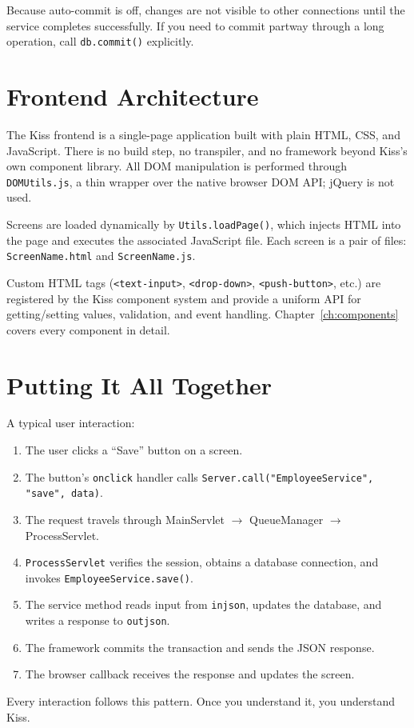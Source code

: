 \begin{warnbox}
Because auto-commit is off, changes are not visible to other connections until the service completes successfully.  If you need to commit partway through a long operation, call \texttt{db.commit()} explicitly.
\end{warnbox}

\section{Frontend Architecture}
\label{sec:arch-frontend}

The Kiss frontend is a single-page application built with plain HTML, CSS, and JavaScript.  There is no build step, no transpiler, and no framework beyond Kiss's own component library.  All DOM manipulation is performed through \texttt{DOMUtils.js}, a thin wrapper over the native browser DOM API; jQuery is not used.

Screens are loaded dynamically by \texttt{Utils.loadPage()}, which injects HTML into the page and executes the associated JavaScript file.  Each screen is a pair of files: \texttt{ScreenName.html} and \texttt{ScreenName.js}.

Custom HTML tags (\texttt{<text-input>}, \texttt{<drop-down>}, \texttt{<push-button>}, etc.) are registered by the Kiss component system and provide a uniform API for getting/setting values, validation, and event handling.  Chapter~\ref{ch:components} covers every component in detail.

\section{Putting It All Together}
\label{sec:arch-summary}

A typical user interaction:

\begin{enumerate}
  \item The user clicks a ``Save'' button on a screen.
  \item The button's \texttt{onclick} handler calls \texttt{Server.call("EmployeeService", "save", data)}.
  \item The request travels through MainServlet $\to$ QueueManager $\to$ ProcessServlet.
  \item \texttt{ProcessServlet} verifies the session, obtains a database connection, and invokes \texttt{EmployeeService.save()}.
  \item The service method reads input from \texttt{injson}, updates the database, and writes a response to \texttt{outjson}.
  \item The framework commits the transaction and sends the JSON response.
  \item The browser callback receives the response and updates the screen.
\end{enumerate}

\noindent
Every interaction follows this pattern.  Once you understand it, you understand Kiss.
